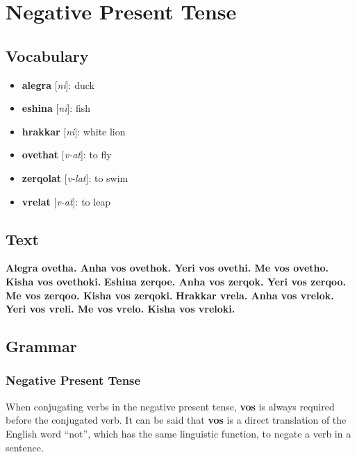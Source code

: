 \chapter{Negative Present Tense}
\section*{Vocabulary}
\begin{itemize}
	\item \textbf{alegra} [\textit{ni}]: duck
	\item \textbf{eshina} [\textit{ni}]: fish
	\item \textbf{hrakkar} [\textit{ni}]: white lion
	\item \textbf{ovethat} [\textit{v-at}]: to fly
	\item \textbf{zerqolat} [\textit{v-lat}]: to swim
	\item \textbf{vrelat} [\textit{v-at}]: to leap
\end{itemize}
\section*{Text}
\textbf{Alegra ovetha. Anha vos ovethok. Yeri vos ovethi. Me vos ovetho. Kisha vos ovethoki.}
\textbf{Eshina zerqoe. Anha vos zerqok. Yeri vos zerqoo. Me vos zerqoo. Kisha vos zerqoki.}
\textbf{Hrakkar vrela. Anha vos vrelok. Yeri vos vreli. Me vos vrelo. Kisha vos vreloki.}
\section*{Grammar}
\subsection*{Negative Present Tense}
When conjugating verbs in the negative present tense, \textbf{vos} is always required before the conjugated verb. It can
be said that \textbf{vos} is a direct translation of the English word ``not'', which has the same linguistic function, to negate a verb in
a sentence.
